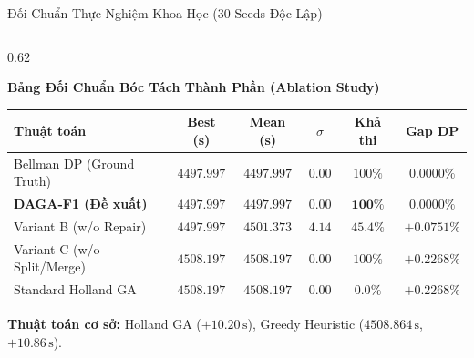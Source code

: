 \documentclass[aspectratio=169, 10pt]{beamer}
\begin{document}
\begin{frame}{Đối Chuẩn Thực Nghiệm Khoa Học (30 Seeds Độc Lập)}
  \vspace{-0.25cm}
  \begin{columns}[T]
    \begin{column}{0.62\textwidth}
      \begin{block}{\textbf{Bảng Đối Chuẩn Bóc Tách Thành Phần (Ablation Study)}}
        \tiny
        \renewcommand{\arraystretch}{1.04}
        \begin{tabularx}{\linewidth}{lccccc}
          \toprule
          \textbf{Thuật toán} & \textbf{Best (s)} & \textbf{Mean (s)} & \textbf{$\sigma$} & \textbf{Khả thi} & \textbf{Gap DP} \\
          \midrule
          Bellman DP (Ground Truth) & $4497.997$ & $4497.997$ & $0.00$ & $100\%$ & $0.0000\%$ \\
          \midrule
          \textbf{DAGA-F1 (Đề xuất)} & $\mathbf{4497.997}$ & $\mathbf{4497.997}$ & $\mathbf{0.00}$ & $\mathbf{100\%}$ & $\mathbf{0.0000\%}$ \\
          Variant B (w/o Repair) & $4497.997$ & $4501.373$ & $4.14$ & $45.4\%$ & $+0.0751\%$ \\
          Variant C (w/o Split/Merge) & $4508.197$ & $4508.197$ & $0.00$ & $100\%$ & $+0.2268\%$ \\
          Standard Holland GA & $4508.197$ & $4508.197$ & $0.00$ & $0.0\%$ & $+0.2268\%$ \\
          \bottomrule
        \end{tabularx}
        \vspace{0.05cm}
        \centering
        \tiny \textbf{Thuật toán cơ sở:} Holland GA ($+10.20\,\text{s}$), Greedy Heuristic ($4508.864\,\text{s}$, $+10.86\,\text{s}$).
      \end{block}
    \end{column}


\end{columns}
\end{frame}
\end{document}
